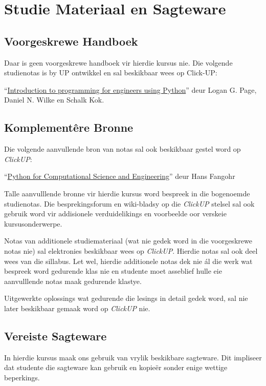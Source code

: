 \section{Studie Materiaal en Sagteware}
    \subsection{Voorgeskrewe Handboek}
        Daar is geen voorgeskrewe handboek vir hierdie kursus nie. Die volgende 
        studienotas is by UP ontwikkel en sal beskikbaar wees op Click-UP:
        
        ``\underline{Introduction to programming for engineers using
          Python}'' deur Logan G. Page, Daniel N. Wilke en Schalk Kok.
    
    \subsection{Komplement\^{e}re Bronne}
        Die volgende aanvullende bron van notas sal ook beskikbaar gestel
        word op \textit{ClickUP}:
            
        ``\underline{Python for Computational Science and Engineering}'' deur 
        Hans Fangohr
        
        Talle aanvulllende bronne vir hierdie kursus word bespreek in die
        bogenoemde studienotas.  Die besprekingsforum en wiki-bladsy
        op die \textit{ClickUP} stelsel sal ook gebruik word vir addisionele
        verduidelikings en voorbeelde oor verskeie kursusonderwerpe. 
        
        Notas van additionele studiemateriaal (wat nie gedek word in die voorgeskrewe
        notas nie) sal elektronies beskikbaar wees op \textit{ClickUP}. Hierdie 
        notas sal ook deel wees van die sillabus.  Let wel, hierdie additionele notas 
        dek nie \'{a}l die werk wat bespreek word gedurende klas nie en studente
        moet asseblief hulle eie aanvulllende notas maak gedurende klastye.
        
        Uitgewerkte oplossings wat gedurende die lesings in detail gedek word, sal nie
        later beskikbaar gemaak word op \textit{ClickUP} nie.
        

    \subsection{Vereiste Sagteware}
	In hierdie kursus maak ons gebruik van vrylik beskikbare sagteware.
	Dit impliseer dat studente die sagteware kan gebruik en kopie\"er sonder
	enige wettige beperkings.

